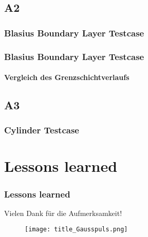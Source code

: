 \documentclass[
	11pt, %
	aspectratio=169, %
]{beamer}
\begin{document}
\subsection{A2}

\begin{frame}
	\frametitle{Blasius Boundary Layer Testcase}


\end{frame}


\begin{frame}
	\frametitle{Blasius Boundary Layer Testcase}
	\framesubtitle{Vergleich des Grenzschichtverlaufs} %
\end{frame}
	

\subsection{A3}
\begin{frame}
\frametitle{Cylinder Testcase}



\end{frame}



 \section{Lessons learned}

 \begin{frame}
 	\frametitle{Lessons learned}

 \end{frame}



\begin{frame} %
	 	\begin{center}
		
		\bigskip \bigskip %
		
		{\Large Vielen Dank für die Aufmerksamkeit!}
		\begin{figure}
			\texttt{[image: title\_Gausspuls.png]}
		\end{figure}
	\end{center}
 \end{frame}
\end{document}

